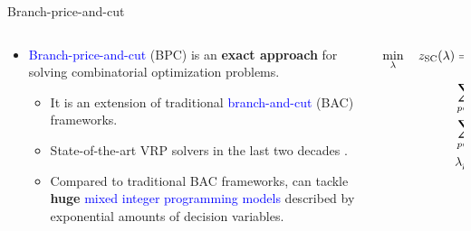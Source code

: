 \begin{frame}{Branch-price-and-cut}
	\begin{columns}
		\begin{column}{.7\textwidth}
			\begin{itemize}[<+->]
				\item \textcolor{blue}{Branch-price-and-cut} (BPC) is an \textbf{exact approach} for solving combinatorial optimization problems.
				      \begin{itemize}
					      \item It is an extension of traditional \textcolor{blue}{branch-and-cut} (BAC) frameworks.
					      \item State-of-the-art VRP solvers in the last two decades \parencite{fukasawa2006, pessoa2008, gutierrez-jarpa2010, archetti2011, bettinelli2011, contardo2014, contardo2015, pecin2017new, pecin2017improved, pessoa2020generic}.
					            \pause[\thebeamerpauses]
					      \item Compared to traditional BAC frameworks, can tackle \textbf{huge} \textcolor{blue}{mixed integer programming models} described by exponential amounts of decision variables.
				      \end{itemize}
			\end{itemize}
		\end{column}
		\begin{column}{.3\textwidth}
			{
				\fontsize{9.5pt}{9.5pt}\selectfont

				\begin{align*}
					\min_{\lambda} \quad z_\mt{SC}(\lambda) & = \sum_{p \in P}  c_p \lambda_p                                      \\
					                                        & \sum_{p \in P} \lambda_{p} = K                                       \\
					                                        & \sum_{p \in P}  a_{ip} \lambda_p \ge 1       \quad \forall i \in V_0 \\
					                                        & \lambda_p                    \in \Set*{0, 1} \quad \forall p \in P.
				\end{align*}
			}
		\end{column}
	\end{columns}

	\pause[\thebeamerpauses]


\end{frame}
